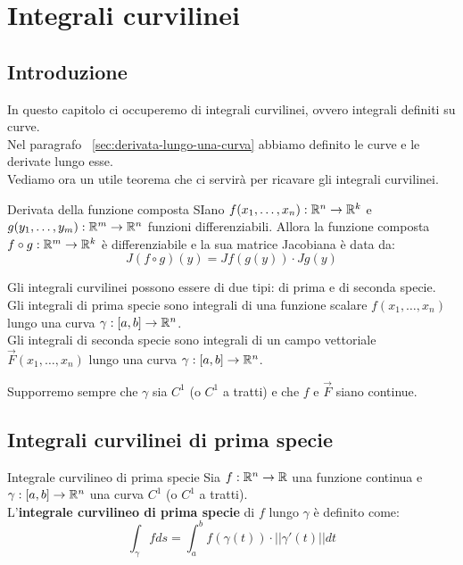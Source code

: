 \chapter{Integrali curvilinei}

\section{Introduzione}
In questo capitolo ci occuperemo di integrali curvilinei, ovvero integrali definiti su curve.\\
Nel paragrafo ~\ref{sec:derivata-lungo-una-curva} abbiamo definito le curve e le derivate lungo esse.\\
Vediamo ora un utile teorema che ci servirà per ricavare gli integrali curvilinei.

\begin{teorema}{Derivata della funzione composta}
  SIano $f(x_1, \dots, x_n): \mathbb{R}^n \rightarrow \mathbb{R}^k$ e $g(y_1, \dots, y_m): \mathbb{R}^m \rightarrow \mathbb{R}^n$ funzioni differenziabili. Allora la funzione composta $f \circ g: \mathbb{R}^m \rightarrow \mathbb{R}^k$ è differenziabile e la sua matrice Jacobiana è data da:
  $$J(f \circ g)(y) = Jf(g(y)) \cdot Jg(y)$$
\end{teorema}

Gli integrali curvilinei possono essere di due tipi: di prima e di seconda specie.\\
Gli integrali di prima specie sono integrali di una funzione scalare $f(x_1, \dots, x_n)$ lungo una curva $\gamma: [a, b] \rightarrow \mathbb{R}^n$.\\
Gli integrali di seconda specie sono integrali di un campo vettoriale $\vec F(x_1, \dots, x_n)$ lungo una curva $\gamma: [a, b] \rightarrow \mathbb{R}^n$.\\

\begin{osservazione}{}
  Supporremo sempre che $\gamma$ sia $C^1$ (o $C^1$ a tratti) e che $f$ e $\vec F$ siano continue.
\end{osservazione}

\section{Integrali curvilinei di prima specie}
\begin{definizione}{Integrale curvilineo di prima specie}
  Sia $f: \mathbb{R}^n \rightarrow \mathbb{R}$ una funzione continua e $\gamma: [a, b] \rightarrow \mathbb{R}^n$ una curva $C^1$ (o $C^1$ a tratti).\\
  L'\textbf{integrale curvilineo di prima specie} di $f$ lungo $\gamma$ è definito come:
  $$\int_\gamma f ds = \int_a^b f(\gamma(t)) \cdot ||\gamma'(t)|| dt$$
\end{definizione}

